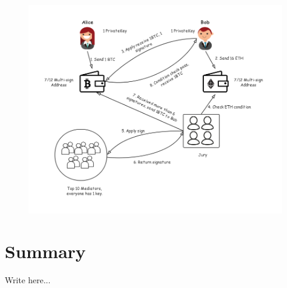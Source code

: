 \begin{figure}[H]
    \includegraphics[width=1\textwidth]{./figures/mediator.png}
    \centering
    \caption{ \protect\footnotemark}
    \centering
\end{figure}


\section{Summary}

Write here...

